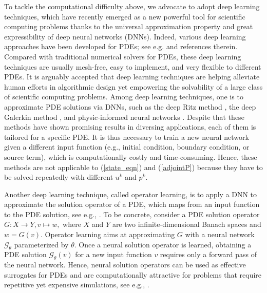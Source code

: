 \documentclass[final]{siamart171218}
\theoremstyle{remark}
\begin{document}
To tackle the computational difficulty above, we advocate to adopt deep learning techniques, which have recently emerged as a new powerful tool for scientific computing problems thanks to the universal approximation property and great expressibility of deep neural networks (DNNs). Indeed, various deep learning approaches have been developed for PDEs; see e.g. \cite{beck2019,e2018,han2018,lu2021learning,ludeepxde2021,raissi2019physics,sirignano2018dgm,wang2021} and references therein. Compared with traditional numerical solvers for PDEs, these deep learning techniques are usually mesh-free, easy to implement, and very flexible to different PDEs. It is arguably accepted that deep learning techniques are helping alleviate human efforts in algorithmic design yet empowering the solvability of a large class of scientific computing problems. Among deep learning techniques, one is to approximate PDE solutions via DNNs, such as the deep Ritz method \cite{e2018}, the deep Galerkin method \cite{sirignano2018dgm},  and physic-informed neural networks \cite{ludeepxde2021,pang2019,raissi2019physics,yu2022gPINN}. Despite that these methods have shown promising results in diversing applications, each of them is tailored for a specific PDE. It is thus necessary to train a new neural network given a different input function (e.g., initial condition, boundary condition, or source term), which is computationally costly and time-consuming. Hence, these methods are not applicable to (\ref{state_eqn}) and (\ref{adjointP}) because they have to be solved repeatedly with different $u^k$ and $p^k$.

Another deep learning technique, called operator learning, is to apply a DNN to approximate the solution operator of a PDE, which maps from an input function to the PDE solution, see e.g., \cite{kocachki2021,li2020FNO,lu2021learning,wang2021}. To be concrete, consider a PDE solution operator  $G  : X \rightarrow  Y, v \mapsto w,$ where $X$ and $Y$ are two infinite-dimensional Banach spaces and $w = G (v)$. Operator learning aims at approximating $G$ with a neural network $\mathcal{G}_\theta$ parameterized by $\theta$. Once a neural solution operator is learned, obtaining a PDE solution $\mathcal{G}_\theta (v)$ for a new input function $v$ requires only a forward pass of the neural network. Hence, neural solution operators can be used as effective surrogates for PDEs and are computationally attractive for problems that require repetitive yet expensive simulations, see e.g., \cite{hwang2021solving,lye2021iterative,wang2021fast}.
\end{document}
